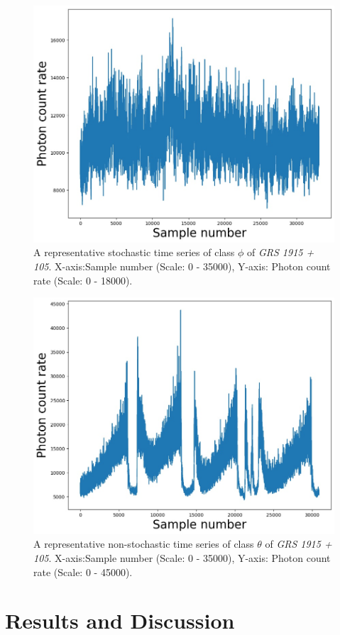 \documentclass[10pt,conference]{IEEEtran}
\begin{document}
\begin{figure}[ht]
\centering
\includegraphics[width=0.9\linewidth]{sac_ascf_phi.jpg}
\caption{A representative stochastic time series of class $\phi$ of \textit{GRS 1915 + 105}. X-axis:Sample number (Scale: 0 - 35000), Y-axis: Photon count rate (Scale: 0 - 18000). }
\label{phi_ts}
\end{figure}

\begin{figure}[ht]
\centering
\includegraphics[width=0.8\linewidth]{sac_ascf_theta.jpg}
\caption{A representative non-stochastic time series of class $\theta$ of \textit{GRS 1915 + 105}. X-axis:Sample number (Scale: 0 - 35000), Y-axis: Photon count rate (Scale: 0 - 45000). }
\label{theta_ts}
\end{figure}

\section{Results and Discussion}
\end{document}

